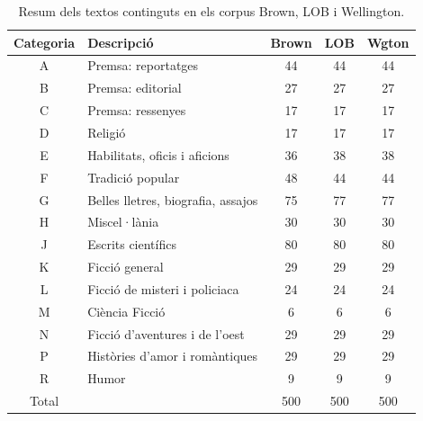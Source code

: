 \begin{table}
\centering
\begin{tabular}{|c|l|c|c|c|}
\hline
Categoria & Descripció & Brown & LOB & Wgton\\
\hline
A & Premsa: reportatges & 44 & 44 & 44\\
B & Premsa: editorial & 27 & 27 & 27\\
C & Premsa: ressenyes & 17 & 17 & 17\\
D & Religió & 17 & 17 & 17\\
E & Habilitats, oficis i aficions & 36 & 38 & 38\\
F & Tradició popular & 48 & 44 & 44\\
G & Belles lletres, biografia, assajos & 75 & 77 & 77\\
H & Miscel·lània & 30 & 30 & 30\\
J & Escrits científics & 80 & 80 & 80\\
K & Ficció general & 29 & 29 & 29\\
L & Ficció de misteri i policiaca & 24 & 24 & 24\\
M & Ciència Ficció & 6 & 6 & 6\\
N & Ficció d'aventures i de l'oest & 29 & 29 & 29\\
P & Històries d'amor i romàntiques & 29 & 29 & 29\\
R & Humor & 9 & 9 & 9\\
\hline
Total & & 500 & 500 & 500\\
\hline
\end{tabular}
\caption{Resum dels textos continguts en els corpus Brown, LOB i Wellington.}\label{tab:corpus_lm}
\end{table}
